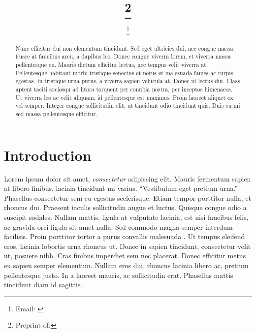 \documentclass[11pt,letterpaper]{article} %
\begin{document}
	
\title{\papertitle\footnote{{Preprint of: \papercitation}}}
\author[]{\myname\footnote{Email: \href{mailto:\myemail}{\myemail}}}
\affil[]{\myaffiliation}
\date{\paperdate}
	
\maketitle

\begin{abstract}
Nunc efficitur dui non elementum tincidunt. Sed eget ultricies dui, nec congue massa. Fusce at faucibus arcu, a dapibus leo. Donec congue viverra lorem, et viverra massa pellentesque eu. Mauris dictum efficitur lectus, nec tempus velit viverra at. Pellentesque habitant morbi tristique senectus et netus et malesuada fames ac turpis egestas. In tristique urna purus, a viverra sapien vehicula at. Donec id lectus dui. Class aptent taciti sociosqu ad litora torquent per conubia nostra, per inceptos himenaeos. Ut viverra leo ac velit aliquam, id pellentesque est maximus. Proin laoreet aliquet ex vel semper. Integer congue sollicitudin elit, ut tincidunt odio tincidunt quis. Duis eu mi sed massa pellentesque efficitur.
\vspace{1cm}
\end{abstract}


\section{Introduction}

Lorem ipsum dolor sit amet, \emph{consectetur} adipiscing elit. Mauris fermentum sapien at libero finibus, lacinia tincidunt mi varius. \enquote{Vestibulum eget pretium urna.} Phasellus consectetur sem eu egestas scelerisque. Etiam tempor porttitor nulla, et rhoncus dui. Praesent iaculis sollicitudin augue et luctus. Quisque congue odio a suscipit sodales. Nullam mattis, ligula at vulputate lacinia, est nisi faucibus felis, ac gravida orci ligula sit amet nulla. Sed commodo magna semper interdum facilisis. Proin porttitor tortor a purus convallis malesuada \citep{boeing_new_2017}. Ut tempus eleifend eros, lacinia lobortis urna rhoncus ut. Donec in sapien tincidunt, consectetur velit ut, posuere nibh. Cras finibus imperdiet sem nec placerat. Donec efficitur metus eu sapien semper elementum. Nullam eros dui, rhoncus lacinia libero ac, pretium pellentesque justo. In a laoreet mauris, ac sollicitudin erat. Phasellus mattis tincidunt diam id sagittis.
\end{document}
